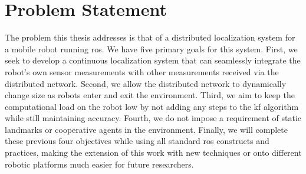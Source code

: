 \documentclass[thesis.tex]{subfile}
\begin{document}
%

\section{Problem Statement} \label{sec:Problem Statement}
The problem this thesis addresses is that of a distributed localization system for a mobile robot running \gls{ros}. We have five primary goals for this system. First, we seek to develop a continuous localization system that can seamlessly integrate the robot's own sensor measurements with other measurements received via the distributed network. Second, we allow the distributed network to dynamically change size as robots enter and exit the environment. Third, we aim to keep the computational load on the robot low by not adding any steps to the \gls{kf} algorithm while still maintaining accuracy. Fourth, we do not impose a requirement of static landmarks or cooperative agents in the environment. Finally, we will complete these previous four objectives while using all standard \gls{ros} constructs and practices, making the extension of this work with new techniques or onto different robotic platforms much easier for future researchers.
\end{document}

